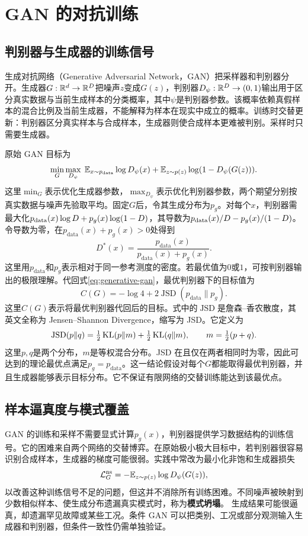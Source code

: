 \section{GAN 的对抗训练}

\subsection{判别器与生成器的训练信号}

生成对抗网络（Generative Adversarial Network，GAN）把采样器和判别器分开。生成器$G:\mathbb{R}^d\to\mathbb{R}^D$把噪声$z$变成$G(z)$，判别器$D_{\psi}:\mathbb{R}^D\to(0,1)$输出用于区分真实数据与当前生成样本的分类概率，其中$\psi$是判别器参数。该概率依赖真假样本的混合比例及当前生成器，不能解释为样本在现实中成立的概率。训练时交替更新：判别器区分真实样本与合成样本，生成器则使合成样本更难被判别。采样时只需要生成器。

原始 GAN 目标为
\begin{equation}
\min_G\max_{D_{\psi}}\;\mathbb{E}_{x\sim p_{\mathrm{data}}}\log D_{\psi}(x)+\mathbb{E}_{z\sim p(z)}\log(1-D_{\psi}(G(z))).
\label{eq:generative-gan}
\end{equation}
这里$\min_G$表示优化生成器参数，$\max_{D_\psi}$表示优化判别器参数，两个期望分别按真实数据与噪声先验取平均。固定$G$后，令其生成分布为$p_g$。对每个$x$，判别器需最大化$p_{\rm data}(x)\log D+p_g(x)\log(1-D)$，其导数为$p_{\rm data}(x)/D-p_g(x)/(1-D)$。令导数为零，在$p_{\mathrm{data}}(x)+p_g(x)>0$处得到
\[
D^*(x)=\frac{p_{\mathrm{data}}(x)}{p_{\mathrm{data}}(x)+p_g(x)}.
\]
这里用$p_{\mathrm{data}}$和$p_g$表示相对于同一参考测度的密度。若最优值为$0$或$1$，可按判别器输出的极限理解。代回式\eqref{eq:generative-gan}，最优判别器下的目标值为
\[
C(G)=-\log4+2\operatorname{JSD}(p_{\mathrm{data}}\|p_g).
\]
这里$C(G)$表示将最优判别器代回后的目标。式中的$\operatorname{JSD}$是詹森--香农散度，其英文全称为 Jensen\allowbreak--\allowbreak Shannon Divergence，缩写为 JSD。它定义为
\[
\operatorname{JSD}(p\|q)=\tfrac12\operatorname{KL}(p\|m)+\tfrac12\operatorname{KL}(q\|m),
\qquad m=\tfrac12(p+q).
\]
这里$p,q$是两个分布，$m$是等权混合分布。JSD 在且仅在两者相同时为零，因此可达到的理论最优点满足$p_g=p_{\mathrm{data}}$。这一结论假设对每个$G$都能取得最优判别器，并且生成器能够表示目标分布。它不保证有限网络的交替训练能达到该最优点。

\subsection{样本逼真度与模式覆盖}

GAN 的训练和采样不需要显式计算$p_g(x)$，判别器提供学习数据结构的训练信号。它的困难来自两个网络的交替博弈。在原始极小极大目标中，若判别器很容易识别合成样本，生成器的梯度可能很弱。实践中常改为最小化非饱和生成器损失
\[
\mathcal L_G^{\mathrm{ns}}=-\mathbb{E}_{z\sim p(z)}\log D_{\psi}(G(z)),
\]
以改善这种训练信号不足的问题，但这并不消除所有训练困难。不同噪声被映射到少数相似样本、使生成分布遗漏真实模式时，称为\textbf{模式坍塌}。
生成结果可能很逼真，却遗漏罕见故障或某些工况。条件 GAN 可以把类别、工况或部分观测输入生成器和判别器，但条件一致性仍需单独验证。

